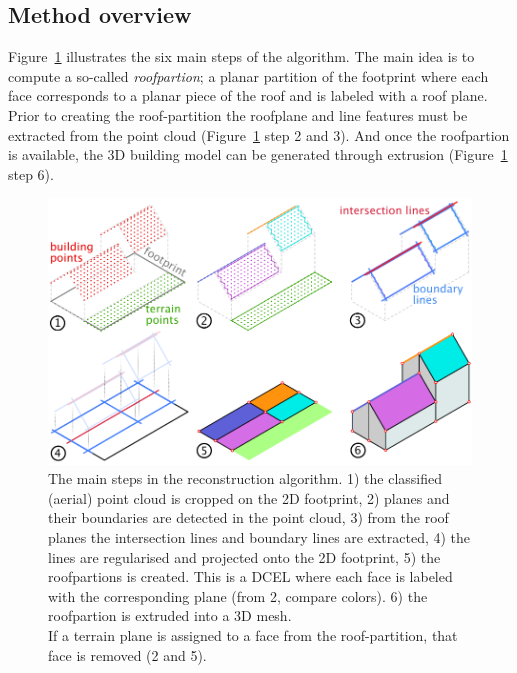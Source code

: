 \subsection{Method overview}
Figure~\ref{fig:method-overview} illustrates the six main steps of the algorithm. The main idea is to compute a so-called \emph{roofpartion}; a planar partition of the footprint where each face corresponds to a planar piece of the roof and is labeled with a roof plane. Prior to creating the roof-partition the roofplane and line features must be extracted from the point cloud (Figure~\ref{fig:method-overview} step 2 and 3). And once the roofpartion is available, the 3D building model can be generated through extrusion (Figure~\ref{fig:method-overview} step 6).
\begin{figure}
	\centering
	\includegraphics[width=\linewidth]{figs/reconstruction-overview.pdf}
	\caption{The main steps in the reconstruction algorithm. 1) the classified (aerial) point cloud is cropped on the 2D footprint, 2) planes and their boundaries are detected in the point cloud, 3) from the roof planes the intersection lines and boundary lines are extracted, 4) the lines are regularised and projected onto the 2D footprint, 5) the roofpartions is created. This is a DCEL where each face is labeled with the corresponding plane (from 2, compare colors). 6) the roofpartion is extruded into a 3D mesh. \\If a terrain plane is assigned to a face from the roof-partition, that face is removed (2 and 5).}%
	\label{fig:method-overview}
\end{figure}


